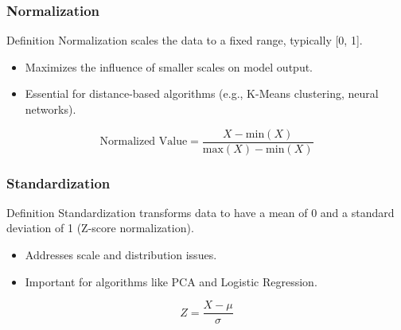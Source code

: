 \documentclass[aspectratio=169]{beamer}
\begin{document}
\begin{frame}[fragile]
    \frametitle{Normalization}
    \begin{block}{Definition}
        Normalization scales the data to a fixed range, typically [0, 1].
    \end{block}
    \begin{itemize}
        \item Maximizes the influence of smaller scales on model output.
        \item Essential for distance-based algorithms (e.g., K-Means clustering, neural networks).
    \end{itemize}
    \begin{equation}
        \text{Normalized Value} = \frac{X - \text{min}(X)}{\text{max}(X) - \text{min}(X)}
    \end{equation}
\end{frame}

\begin{frame}[fragile]
    \frametitle{Standardization}
    \begin{block}{Definition}
        Standardization transforms data to have a mean of 0 and a standard deviation of 1 (Z-score normalization).
    \end{block}
    \begin{itemize}
        \item Addresses scale and distribution issues.
        \item Important for algorithms like PCA and Logistic Regression.
    \end{itemize}
    \begin{equation}
        Z = \frac{X - \mu}{\sigma}
    \end{equation}
\end{frame}
\end{document}
